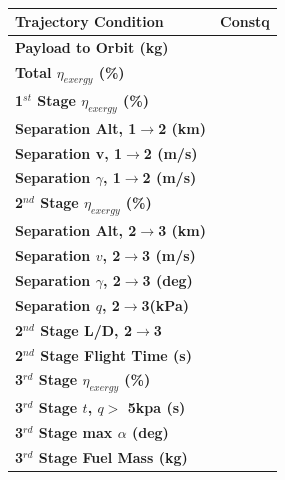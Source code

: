 \begin{table}[ht]
	\centering
	
	\begin{tabular}{l c } 
		\hline \textbf{Trajectory Condition}
		& Constq

		\\
		\hline \textbf{Payload to Orbit (kg)}
		& \textbf{\PayloadToOrbitConstq}
		\\
		\textbf{Total $\eta_{exergy}$ (\%)}
		& \textbf{\totalExergyEffConstq}
		\\
		\hline 
		\textbf{1$^{st}$ Stage $\eta_{exergy}$ (\%)}
		& \textbf{\firstExergyEffConstq}
		\\
		\textbf{Separation Alt, 1$\rightarrow$2 (km)}
		& \firstsecondSeparationAltConstq
		\\
		\textbf{Separation v, 1$\rightarrow$2 (m/s)}
		& \firstsecondSeparationvConstq
		\\
		\textbf{Separation $\gamma$, 1$\rightarrow$2 (m/s)}
		& \firstsecondSeparationgammaConstq
		\\
		\hline 
		\textbf{2$^{nd}$ Stage $\eta_{exergy}$ (\%)}
		& \textbf{\secondExergyEffConstq}
		\\
		\textbf{Separation Alt, 2$\rightarrow$3 (km)}
		& \secondthirdSeparationAltConstq
		\\
		\textbf{Separation $v$, 2$\rightarrow$3 (m/s)}
		& \secondthirdSeparationvConstq
		\\
		\textbf{Separation $\gamma$, 2$\rightarrow$3 (deg)}
		& \secondthirdSeparationgammaConstq
		\\
		\textbf{Separation $q$, 2$\rightarrow$3(kPa)}
		& \secondthirdSeparationqConstq
		\\
		\textbf{2$^{nd}$ Stage L/D, 2$\rightarrow$3}
		& \secondthirdSeparationLDConstq
		\\
		\textbf{2$^{nd}$ Stage Flight Time (s)}
		& \secondFlightTimeConstq
		\\
		\hline 
		\textbf{3$^{rd}$ Stage $\eta_{exergy}$ (\%)}
		& \textbf{\thirddExergyEffConstq}
		\\
		\textbf{3$^{rd}$ Stage $t$, $q >$ 5kpa (s)}
		& \thirdqOverFiveConstq
		\\
		\textbf{3$^{rd}$ Stage max $\alpha$ (deg)}
		& \thirdmaxAoAConstq
		\\
		\textbf{3$^{rd}$ Stage Fuel Mass (kg)}
		& \thirdmFuelConstq
		\\
		\hline 
	\end{tabular} 
	
	\caption{}
	\label{tab:constqsummary}
\end{table}
